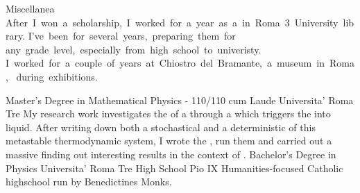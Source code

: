 \documentclass[9pt]{developercv} %
\newcommand{\myHilight}[2]{\tcbtp{\textit{\color{#1}{#2}}}}
\begin{document}
\begin{entrylist}
	
    \entry
	    { Miscellanea }
	    {}
	    {}
	    {\mbox{After I won a scholarship, I worked for a year as a \myHilight{textcolor}{librarian} 
        in Roma 3 University library.} \linebreak \mbox{I’ve been \myHilight{textcolor}{tutoring students 
        in mathematics and physics} for several years, preparing them for} 
        \linebreak 
        \mbox{any grade level, especially from high school to univeristy.}
        \linebreak{}
        \mbox{I worked for a couple of years at Chiostro del Bramante, 
        a museum in Roma,}
        \linebreak
        \myHilight{textcolor}{keeping watch on} \mbox{\myHilight{textcolor}{artworks} during exhibitions.}}
\end{entrylist}



\begin{entrylist}
	\entry
		{}
		{Master's Degree in Mathematical Physics - 110/110 cum Laude}
		{Universita' Roma Tre}
		{My research work investigates the \myHilight{textcolor}{relaxation to the equilibrium} of a 
        \myHilight{textcolor}{supersaturated gas} through a \myHilight{textcolor}{critical droplet} 
        which triggers the \myHilight{textcolor}{phase transition} into liquid.
        \newline 
        After writing down both a stochastical and a deterministic \myHilight{textcolor}{mathematical model} 
        of this metastable thermodynamic system, 
        I wrote the \myHilight{textcolor}{C++ simulations}, run them and carried out a massive \myHilight{textcolor}{data analysis in Python} 
        finding out interesting results in the context of \myHilight{textcolor}{Non-Equilibrium Statistical Mechanics}.}
	\entry
		{}
		{Bachelor's Degree in Physics}
		{Universita' Roma Tre}
		{}
	\entry
		{}
		{High School}
		{Pio IX}
		{Humanities-focused Catholic highschool run by Benedictines Monks.}
\end{entrylist}
\end{document}
